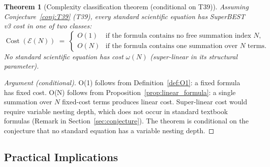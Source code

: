 \documentclass[12pt,a4paper]{article}
\newtheorem{theorem}{Theorem}[section]
\theoremstyle{definition}
\newcommand{\Cost}{\operatorname{Cost}}
\begin{document}
\begin{theorem}[Complexity classification theorem (conditional on T39)]
\label{thm:classification}
Assuming Conjecture~\ref{conj:T39} (T39), every standard scientific
equation has SuperBEST v3 cost in one of two classes:
\[
  \Cost(\mathcal{E}(N)) \;=\;
  \begin{cases}
    O(1) & \text{if the formula contains no free summation index } N, \\
    O(N) & \text{if the formula contains one summation over } N \text{ terms.}
  \end{cases}
\]
No standard scientific equation has cost $\omega(N)$ (super-linear in
its structural parameter).
\end{theorem}

\begin{proof}[Argument (conditional)]
O(1) follows from Definition~\ref{def:O1}: a fixed formula has fixed
cost.  O(N) follows from Proposition~\ref{prop:linear_formula}: a single
summation over $N$ fixed-cost terms produces linear cost.
Super-linear cost would require variable nesting depth, which does not
occur in standard textbook formulas (Remark in Section~\ref{sec:conjecture}).
The theorem is conditional on the conjecture that no standard equation
has a variable nesting depth.
\end{proof}

\subsection{Practical Implications}
\end{document}
